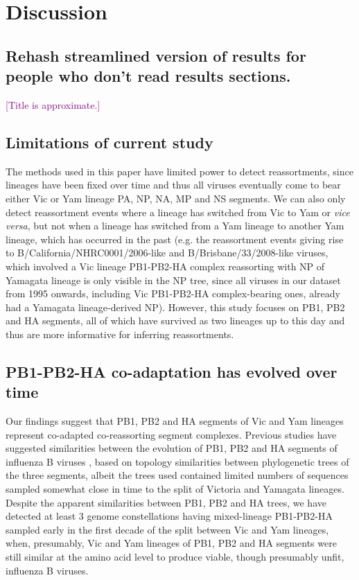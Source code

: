 \documentclass[11pt,oneside,letterpaper]{article}
\def\tbc#1{\textcolor{purple}{[#1]}}
\begin{document}
\section*{Discussion}

\subsection*{Rehash streamlined version of results for people who don't read results sections.}

\tbc{Title is approximate.}

\subsection*{Limitations of current study}
The methods used in this paper have limited power to detect reassortments, since lineages have been fixed over time and thus all viruses eventually come to bear either Vic or Yam lineage PA, NP, NA, MP and NS segments.
We can also only detect reassortment events where a lineage has switched from Vic to Yam or \textit{vice versa}, but not when a lineage has switched from a Yam lineage to another Yam lineage, which has occurred in the past (e.g. the reassortment events giving rise to B/California/NHRC0001/2006-like and B/Brisbane/33/2008-like viruses, which involved a Vic lineage PB1-PB2-HA complex reassorting with NP of Yamagata lineage is only visible in the NP tree, since all viruses in our dataset from 1995 onwards, including Vic PB1-PB2-HA complex-bearing ones, already had a Yamagata lineage-derived NP).
However, this study focuses on PB1, PB2 and HA segments, all of which have survived as two lineages up to this day and thus are more informative for inferring reassortments.

\subsection*{PB1-PB2-HA co-adaptation has evolved over time}
Our findings suggest that PB1, PB2 and HA segments of Vic and Yam lineages represent co-adapted co-reassorting segment complexes.
Previous studies have suggested similarities between the evolution of PB1, PB2 and HA segments of influenza B viruses \cite{hiromoto2000,lindstrom1999}, based on topology similarities between phylogenetic trees of the three segments, albeit the trees used contained limited numbers of sequences sampled somewhat close in time to the split of Victoria and Yamagata lineages.
Despite the apparent similarities between PB1, PB2 and HA trees, we have detected at least 3 genome constellations having mixed-lineage PB1-PB2-HA sampled early in the first decade of the split between Vic and Yam lineages, when, presumably, Vic and Yam lineages of PB1, PB2 and HA segments were still similar at the amino acid level to produce viable, though presumably unfit, influenza B viruses.
\end{document}
